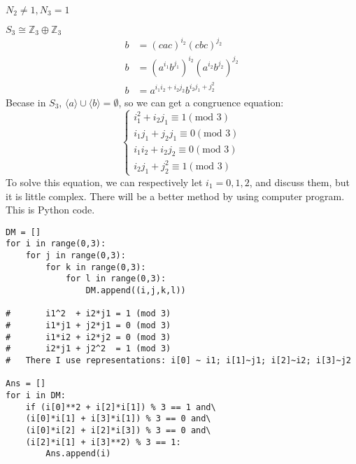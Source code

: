 \documentclass[a4paper,14pt]{article}
\begin{document}
\begin{enumerate}
\begin{item}{$N_2 \neq 1, N_3 = 1$}
\begin{enumerate}
\begin{item}{$S_3\cong \mathbb{Z}_3 \oplus \mathbb{Z}_3$}
\begin{align*}
                        b &= (cac)^{i_2}(cbc)^{j_2}\\
                        b &= (a^{i_1}b^{j_1})^{i_2}(a^{i_2}b^{j_2})^{j_2}\\
                        b &= a^{i_1i_2+i_2j_2}b^{i_2j_1+j_2^2}
                    \end{align*}
                    Becase in $S_3$, $\langle a \rangle \cup \langle b \rangle = \emptyset$, so we can get a congruence equation:
                    $$
                    \begin{cases}
                        i_1^2 + i_2j_1 \equiv 1 (\text{mod 3})\\
                        i_1j_1+ j_2j_1 \equiv 0 (\text{mod 3})\\
                        i_1i_2+ i_2j_2 \equiv 0 (\text{mod 3})\\
                        i_2j_1+ j_2^2  \equiv 1 (\text{mod 3})
                    \end{cases}
                    $$
                    To solve this equation, we can respectively let $i_1=0,1,2$, and discuss them, but it is little complex. There will be a better method by using
                    computer program. This is Python code.
                    \begin{verbatim}
DM = []
for i in range(0,3):
    for j in range(0,3):
        for k in range(0,3):
            for l in range(0,3):
                DM.append((i,j,k,l))

#       i1^2  + i2*j1 = 1 (mod 3)
#       i1*j1 + j2*j1 = 0 (mod 3)
#       i1*i2 + i2*j2 = 0 (mod 3)
#       i2*j1 + j2^2  = 1 (mod 3)
#   There I use representations: i[0] ~ i1; i[1]~j1; i[2]~i2; i[3]~j2

Ans = []
for i in DM:
    if (i[0]**2 + i[2]*i[1]) % 3 == 1 and\
    (i[0]*i[1] + i[3]*i[1]) % 3 == 0 and\
    (i[0]*i[2] + i[2]*i[3]) % 3 == 0 and\
    (i[2]*i[1] + i[3]**2) % 3 == 1:
        Ans.append(i)


\end{verbatim}
\end{item}
\end{enumerate}
\end{item}
\end{enumerate}
\end{document}
